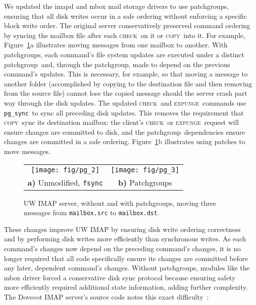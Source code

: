 \documentclass[9pt,twocolumn,letterpaper]{article}
\newcommand{\pgSync}{\texttt{pg\_sync}}
\newcommand{\imapCheck}{{\rmfamily\scshape check}}
\newcommand{\imapCopy}{{\rmfamily\scshape copy}}
\newcommand{\imapExpunge}{{\rmfamily\scshape expunge}}
\newcommand{\patchgroup}{patchgroup}
\newcommand{\patchgroups}{patchgroups}
\newcommand{\Patchgroups}{Patchgroups}
\begin{document}
We updated the imapd and mbox mail storage drivers to use
\patchgroups, ensuring that all disk writes occur in a safe ordering
without enforcing a specific block write order.
%
The original server conservatively preserved command ordering by
syncing the mailbox file after each \imapCheck\ on it or \imapCopy\ into it.
%
For example, Figure~\ref{fig:imap}a illustrates moving messages from
one mailbox to another.
%
With \patchgroups, each command's file system updates are executed under a
distinct \patchgroup\ and, through the \patchgroup, made to depend on the
previous command's updates. This is necessary, for example, so that
moving a message to another folder (accomplished by copying to the
destination file and then removing from the source file) cannot lose
the copied message should the server crash part way through the disk
updates.
%
The updated \imapCheck\ and \imapExpunge\ commands use \pgSync\ to sync all preceding disk
updates. This removes the requirement that \imapCopy\
sync its destination mailbox: the client's \imapCheck\ or \imapExpunge\ request will ensure
changes are committed to disk, and the \patchgroup\ dependencies ensure
changes are committed in a safe ordering.
%
Figure~\ref{fig:imap}b illustrates using patches to move messages.

\begin{figure}[tb]
\centering
\begin{tabular}{@{}cc@{}}
\texttt{[image: fig/pg\_2]} & 
\texttt{[image: fig/pg\_3]}\\
\textbf{a)} Unmodified, \texttt{fsync} & 
\textbf{b)} \Patchgroups
\end{tabular}
\caption{UW IMAP server, without and with \patchgroups, moving three
messages from \texttt{mailbox.src} to \texttt{mailbox.dst}.}
\label{fig:imap}
\end{figure}

These changes improve UW IMAP by
%
ensuring disk write ordering correctness
%
and by performing disk writes more efficiently than synchronous writes.
%
As each command's changes now depend on the preceding command's
changes, it is no longer required that all code
specifically ensure its changes are committed before any later, dependent
command's changes. Without \patchgroups, modules like the mbox driver
forced a conservative disk sync protocol because ensuring safety more
efficiently required additional state information, adding further
complexity. The Dovecot IMAP server's source code notes this exact
difficulty~\cite[maildir-save.c]{dovecot}:
\end{document}
